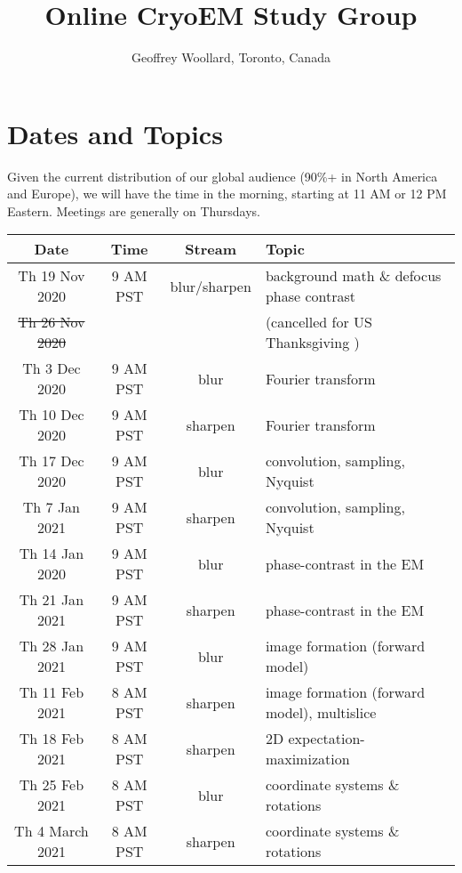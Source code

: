 \documentclass[11pt, oneside]{article}   	%
\title{Online CryoEM Study Group}
\author{Geoffrey Woollard, Toronto, Canada}
\begin{document}
\maketitle

\tableofcontents



\pagebreak
\section{Dates and Topics}
Given the current distribution of our global audience (90\%+  in North America and Europe), we will have the time in the morning, starting at 11 AM or 12 PM Eastern. Meetings are generally on Thursdays.

\begin{center}
\small
 \begin{tabular}{|| c c c p{90mm} ||} 
 \hline
 Date & Time & Stream & Topic \\ [0.5ex] 
 \hline\hline
Th 19 Nov 2020 & \tiny{9 AM PST} &  blur/sharpen & background math \& defocus phase contrast  \\ 
 \hline
\sout{Th 26 Nov 2020}  &   & & (cancelled for US Thanksgiving )    \\ 
 \hline
Th 3 Dec 2020 & \tiny{9 AM PST} & blur & Fourier transform   \\ 
 \hline
Th 10 Dec 2020 & \tiny{9 AM PST} & sharpen & Fourier transform   \\ 
 \hline
Th 17 Dec 2020 & \tiny{9 AM PST} & blur & convolution, sampling, Nyquist   \\ 
 \hline
Th 7 Jan 2021 & \tiny{9 AM PST} & sharpen & convolution, sampling, Nyquist   \\ 
 \hline
Th 14 Jan 2020 & \tiny{9 AM PST} & blur & phase-contrast in the EM   \\ 
 \hline
Th 21 Jan 2021 & \tiny{9 AM PST} & sharpen & phase-contrast in the EM   \\ 
 \hline
Th 28 Jan 2021 & \tiny{9 AM PST} & blur & image formation (forward model)   \\ 
 \hline
Th 11 Feb 2021 & \tiny{8 AM PST} & sharpen & image formation (forward model), multislice   \\ 
 \hline
Th 18 Feb 2021 & \tiny{8 AM PST} & sharpen &  2D expectation-maximization \\ 
 \hline
Th 25 Feb 2021 & \tiny{8 AM PST} & blur & coordinate systems \& rotations  \\ 
 \hline
 Th 4 March 2021 & \tiny{8 AM PST} & sharpen & coordinate systems \& rotations  \\ 

\end{tabular}
\end{center}
\end{document}
